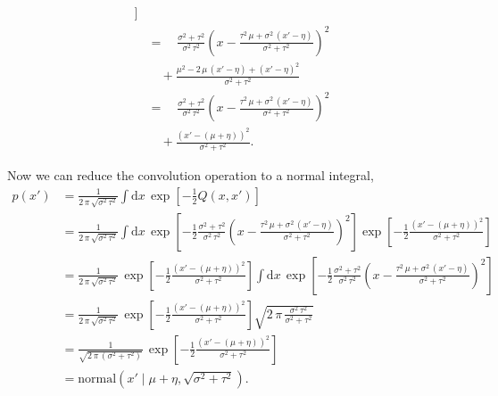 \documentclass[11pt, oneside]{article}
\begin{document}
\begin{align*}
{    }
\bigg]
\\
&=\quad
\frac{\sigma^{2} + \tau^{2} }{ \sigma^{2} \, \tau^{2} }
\left( 
  x - \frac{  \tau^{2} \, \mu + \sigma^{2} \, (x' - \eta) }{ \sigma^{2} + \tau^{2} } 
\right)^{2}
\\
&\quad+
\frac{ 
   \mu^{2} 
 - 2 \, \mu \, (x' - \eta)
 + ( x' - \eta)^{2}
}{
  \sigma^{2} + \tau^{2} 
}
\\
&=\quad
\frac{\sigma^{2} + \tau^{2} }{ \sigma^{2} \, \tau^{2} }
\left( 
  x - \frac{  \tau^{2} \, \mu + \sigma^{2} \, (x' - \eta) }{ \sigma^{2} + \tau^{2} } 
\right)^{2}
\\
&\quad+
\frac{ 
  ( x ' - (\mu + \eta) )^{2}
}{
  \sigma^{2} + \tau^{2} 
}.
\end{align*}

Now we can reduce the convolution operation to a normal integral,
%
\begin{align*}
p( x' ) 
&=
\frac{1}{ 2 \, \pi \, \sqrt{ \sigma^{2} \, \tau^{2} } }
\int \mathrm{d} x \, 
\exp \left[
  -\frac{1}{2} Q(x, x')
\right]
\\
&=
\frac{1}{ 2 \, \pi \, \sqrt{ \sigma^{2} \, \tau^{2} } }
\int \mathrm{d} x \, 
\exp \left[
  -\frac{1}{2} \frac{\sigma^{2} + \tau^{2} }{ \sigma^{2} \, \tau^{2} }
  \left( 
    x - \frac{  \tau^{2} \, \mu + \sigma^{2} \, (x' - \eta) }{ \sigma^{2} + \tau^{2} } 
  \right)^{2}
\right]
\exp \left[
  -\frac{1}{2} \frac{  ( x ' - (\mu + \eta) )^{2} }{ \sigma^{2} + \tau^{2} }
\right]
\\
&=
\frac{1}{ 2 \, \pi \, \sqrt{ \sigma^{2} \, \tau^{2} } } \,
\exp \left[
  -\frac{1}{2} \frac{  ( x ' - (\mu + \eta) )^{2} }{ \sigma^{2} + \tau^{2} }
\right]
\int \mathrm{d} x \, 
\exp \left[
  -\frac{1}{2} \frac{\sigma^{2} + \tau^{2} }{ \sigma^{2} \, \tau^{2} }
  \left( 
    x - \frac{  \tau^{2} \, \mu + \sigma^{2} \, (x' - \eta) }{ \sigma^{2} + \tau^{2} } 
  \right)^{2}
\right]
\\
&=
\frac{1}{ 2 \, \pi \, \sqrt{ \sigma^{2} \, \tau^{2} } } \,
\exp \left[
  -\frac{1}{2} \frac{  ( x ' - (\mu + \eta) )^{2} }{ \sigma^{2} + \tau^{2} }
\right]
\sqrt{2 \, \pi \, \frac{ \sigma^{2} \, \tau^{2} }{\sigma^{2} + \tau^{2} } }
\\
&=
\frac{1}{ \sqrt{ 2 \, \pi \, ( \sigma^{2} + \tau^{2} ) } } \,
\exp \left[
  -\frac{1}{2} \frac{  ( x ' - (\mu + \eta) )^{2} }{ \sigma^{2} + \tau^{2} }
\right]
\\
&=
\text{normal} \left( x' \mid \mu + \eta, \sqrt{ \sigma^{2} + \tau^{2} } \right).
\end{align*}
\end{document}
